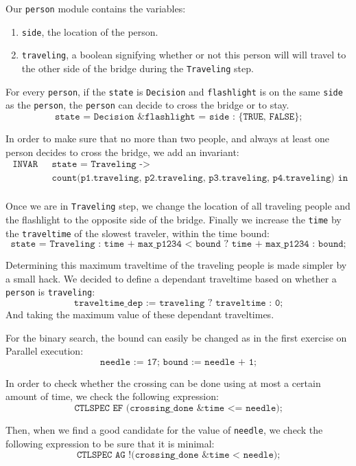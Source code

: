 \documentclass[12pt]{article}
\begin{document}
Our \texttt{person} module contains the variables:
\begin{enumerate}
\item \texttt{side}, the location of the person.
\item \texttt{traveling}, a boolean signifying whether or not this person will will travel to the other side of the bridge during the \texttt{Traveling} step.
\end{enumerate}

For every \texttt{person}, if the \texttt{state} is \texttt{Decision} and \texttt{flashlight} is on the same \texttt{side} as the \texttt{person}, the \texttt{person} can decide to cross the bridge or to stay.
\[ \texttt{state = Decision \& flashlight = side : \{TRUE, FALSE\};} \]

In order to make sure that no more than two people, and always at least one person decides to cross the bridge, we add an invariant:
\[
    \begin{array}{ll}
        \texttt{ INVAR } & \texttt{ state = Traveling -> } \\
        & \texttt{ count(p1.traveling, p2.traveling, p3.traveling, p4.traveling) in 1..2; } \\
    \end{array}
\]

Once we are in \texttt{Traveling} step, we change the location of all traveling people and the flashlight to the opposite side of the bridge.
Finally we increase the \texttt{time} by the \texttt{traveltime} of the slowest traveler, within the time bound:
\[ \texttt{state = Traveling : time + max\_p1234 < bound ? time + max\_p1234 : bound;} \]

Determining this maximum traveltime of the traveling people is made simpler by a small hack.
We decided to define a dependant traveltime based on whether a \texttt{person} is \texttt{traveling}:
\[ \texttt{traveltime\_dep := traveling ? traveltime : 0;} \]
And taking the maximum value of these dependant traveltimes.

For the binary search, the bound can easily be changed as in the first exercise on Parallel execution:
\[\texttt{needle := 17; bound := needle + 1;}\]

In order to check whether the crossing can be done using at most a certain amount of time, we check the following expression:
\[ \texttt{CTLSPEC EF (crossing\_done \& time <= needle);} \]

Then, when we find a good candidate for the value of \texttt{needle}, we check the following expression to be sure that it is minimal:
\[ \texttt{CTLSPEC AG !(crossing\_done \& time < needle);} \]
\end{document}
